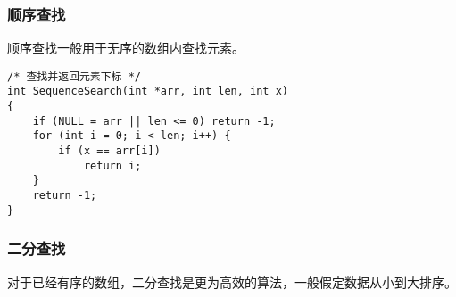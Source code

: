 \documentclass{ctexart}
\begin{document}
\subsubsection{顺序查找}
顺序查找一般用于无序的数组内查找元素。
\begin{verbatim}
/* 查找并返回元素下标 */
int SequenceSearch(int *arr, int len, int x)
{
    if (NULL = arr || len <= 0) return -1;
    for (int i = 0; i < len; i++) {
        if (x == arr[i])
            return i;
    }
    return -1;
}
\end{verbatim}

\subsubsection{二分查找}
对于已经有序的数组，二分查找是更为高效的算法，一般假定数据从小到大排序。
\inputminted{c}{codes/binary-search.c}
\end{document}
